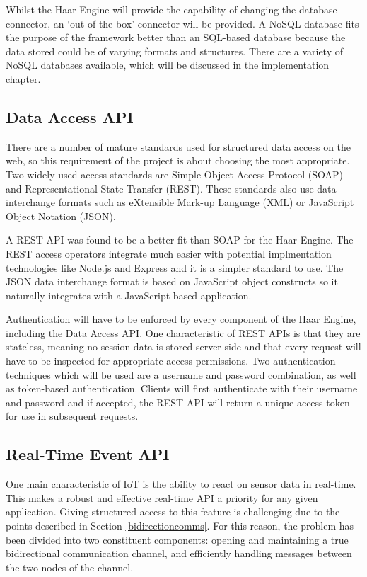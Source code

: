       Whilst the Haar Engine will provide the capability of changing the database connector, an `out of the box' connector will be provided. A NoSQL database fits the purpose of the framework better than an SQL-based database because the data stored could be of varying formats and structures. There are a variety of NoSQL databases available, which will be discussed in the implementation chapter.

    \subsection{Data Access API}
      There are a number of mature standards used for structured data access on the web, so this requirement of the project is about choosing the most appropriate. Two widely-used access standards are Simple Object Access Protocol (SOAP) and Representational State Transfer (REST). These standards also use data interchange formats such as eXtensible Mark-up Language (XML) or JavaScript Object Notation (JSON).

      A REST API was found to be a better fit than SOAP for the Haar Engine. The REST access operators integrate much easier with potential implmentation technologies like Node.js and Express and it is a simpler standard to use. The JSON data interchange format is based on JavaScript object constructs so it naturally integrates with a JavaScript-based application.

      Authentication will have to be enforced by every component of the Haar Engine, including the Data Access API. One characteristic of REST APIs is that they are stateless, meaning no session data is stored server-side and that every request will have to be inspected for appropriate access permissions. Two authentication techniques which will be used are a username and password combination, as well as token-based authentication. Clients will first authenticate with their username and password and if accepted, the REST API will return a unique access token for use in subsequent requests.

    \subsection{Real-Time Event API}
      One main characteristic of IoT is the ability to react on sensor data in real-time. This makes a robust and effective real-time API a priority for any given application. Giving structured access to this feature is challenging due to the points described in Section \ref{bidirectioncomms}. For this reason, the problem has been divided into two constituent components: opening and maintaining a true bidirectional communication channel, and efficiently handling messages between the two nodes of the channel.

